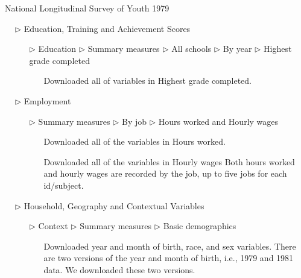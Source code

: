 \documentclass{article}
\begin{document}
\begin{tcolorbox}[label="box:data", title=Getting the data]

\faDatabase~National Longitudinal Survey of Youth 1979

\begin{itemize}
\item[$\triangleright$] Education, Training and Achievement Scores
\begin{itemize}
\item[$\triangleright$] Education $\triangleright$ Summary measures $\triangleright$ All schools $\triangleright$ By year $\triangleright$ Highest grade completed
\begin{itemize}
\item[\faCloudDownload] Downloaded all of variables in Highest grade completed.
\end{itemize}
\end{itemize}
\item[$\triangleright$] Employment
\begin{itemize}
\item[$\triangleright$] Summary measures $\triangleright$ By job $\triangleright$ Hours worked and Hourly wages
\begin{itemize}
\item[\faCloudDownload] Downloaded all of the variables in Hours worked.
\item[\faCloudDownload] Downloaded all of the variables in Hourly wages
  Both hours worked and hourly wages are recorded by the job, up to five jobs for each id/subject. 
\end{itemize}
\end{itemize}
\item[$\triangleright$] Household, Geography and Contextual Variables
\begin{itemize}
\item[$\triangleright$] Context $\triangleright$ Summary measures $\triangleright$ Basic demographics 
\begin{itemize}
\item[\faCloudDownload] Downloaded year and month of birth, race, and sex variables. There are two versions of the year and month of birth, i.e., 1979 and 1981 data. We downloaded these two versions.
\end{itemize}
\end{itemize}
\end{itemize}

\end{tcolorbox}
\end{document}
